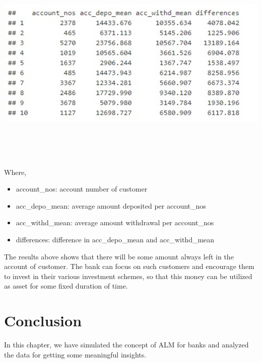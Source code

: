 				\begin{center}
				\includegraphics[width=15cm,height=10cm]{figures/asset-from-saving.jpg}	
				\label{fig: Average balance of randomly selected saving account}
				\end{center}
Where,
\begin{itemize}
\item account\_nos: account number of customer
\item acc\_depo\_mean: average amount deposited per account\_nos
\item acc\_withd\_mean: average amount withdrawal per account\_nos
\item differences: difference in acc\_depo\_mean and acc\_withd\_mean
\end{itemize}

The results above shows that there will be some amount always left in the account of customer. The bank can focus on such customers and encourage them to invest in their various investment schemes, so that this money can be utilized as asset for some fixed duration of time.

\section{Conclusion}

In this chapter, we have simulated the concept of ALM for banks and analyzed the data for getting some meaningful insights. 


